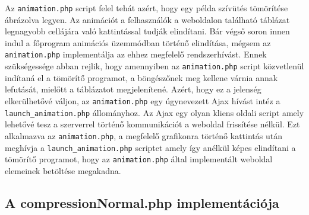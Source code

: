 \documentclass[oneside,titlepage,12pt,a4paper]{report}
\begin{document}
\par Az \texttt{animation.php} script felel tehát azért, hogy egy példa szívütés tömörítése ábrázolva legyen. Az animációt a felhasználók a weboldalon található táblázat legnagyobb cellájára való kattintással tudják elindítani. Bár végső soron innen indul a főprogram animációs üzemmódban történő elindítása, mégsem az \texttt{animation.php} implementálja az ehhez megfelelő rendszerhívást. Ennek szükségessége abban rejlik, hogy amennyiben az \texttt{animation.php} script közvetlenül indítaná el a tömörítő programot, a böngészőnek meg kellene várnia annak lefutását, mielőtt a táblázatot megjelenítené. Azért, hogy ez a jelenség elkerülhetővé váljon, az \texttt{animation.php} egy úgynevezett Ajax hívást intéz a \texttt{launch\_animation.php} állományhoz. Az Ajax egy olyan kliens oldali script amely lehetővé tesz a szerverrel történő kommunikációt a weboldal frissítése nélkül. Ezt alkalmazva az \texttt{animation.php}, a megfelelő grafikonra történő kattintás után meghívja a \texttt{launch\_animation.php} scriptet amely így anélkül képes elindítani a tömörítő programot, hogy az \texttt{animation.php} által implementált weboldal elemeinek betöltése megakadna.  

\subsection{A compressionNormal.php implementációja }
\end{document}
